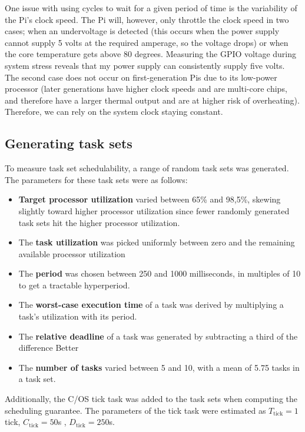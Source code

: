 \documentclass[twoside]{uva-inf-bachelor-thesis}
\newcommand{\ucos}{\textmu C/OS\xspace}
\begin{document}
One issue with using cycles to wait for a given period of time is the variability of the Pi's clock speed. The Pi will, however, only throttle the clock speed in two cases; when an undervoltage is detected (this occurs when the power supply cannot supply 5 volts at the required amperage, so the voltage drops) or when the core temperature gets above 80 degrees\cite{rpi:gpuclockpower}. Measuring the GPIO voltage during system stress reveals that my power supply can consistently supply five volts. The second case does not occur on first-generation Pis due to its low-power processor (later generations have higher clock speeds and are multi-core chips, and therefore have a larger thermal output and are at higher risk of overheating). Therefore, we can rely on the system clock staying constant.

\subsection{Generating task sets}
To measure task set schedulability, a range of random task sets was generated. The parameters for these task sets were as follows:

\begin{itemize}
    \item \textbf{Target processor utilization} varied between 65\% and 98,5\%, skewing slightly toward higher processor utilization since fewer randomly generated task sets hit the higher processor utilization.
    \item The \textbf{task utilization} was picked uniformly between zero and the remaining available processor utilization
    \item The \textbf{period} was chosen between 250 and 1000 milliseconds, in multiples of 10 to get a tractable hyperperiod.
    \item The \textbf{worst-case execution time} of a task was derived by multiplying a task's utilization with its period.
    \item The \textbf{relative deadline} of a task was generated by subtracting a third of the difference Better
    \item The \textbf{number of tasks} varied between 5 and 10, with a mean of 5.75 tasks in a task set.
\end{itemize}

\noindent Additionally, the \ucos tick task was added to the task sets when computing the scheduling guarantee. The parameters of the tick task were estimated as $T_{\text{tick}} = 1$ tick, $C_\text{tick} = 50$\textmu s , $D_\text{tick} = 250$\textmu s.
\end{document}
